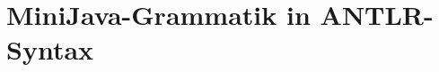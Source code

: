 \chapter{MiniJava-Grammatik in ANTLR-Syntax}
\label{app:MiniJava-Grammatik}



\pagebreak


\pagebreak

